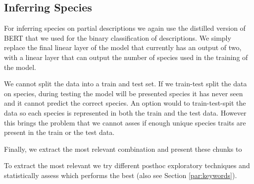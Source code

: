 \documentclass[a4paper, 12pt, oneside]{book} %
\begin{document}

\subsection{Inferring Species} \label{par:inferring}
For inferring species on partial descriptions we again use the distilled version of BERT \autocite{sanh_distilbert_2020, devlin_bert_2019} that we used for the binary classification of descriptions.
We simply replace the final linear layer of the model that currently has an output of two, with a linear layer that can output the number of species used in the training of the model.

We cannot split the data into a train and test set.
If we train-test split the data on species, during testing the model will be presented species it has never seen and it cannot predict the correct species.
An option would to train-test-spit the data so each species is represented in both the train and the test data.
However this brings the problem that we cannot asses if enough unique species traits are present in the train or the test data.


Finally, we extract the most relevant combination and present these chunks to 

To extract the most relevant we try different posthoc exploratory techniques and statistically assess which performs the best (also see Section \ref{par:keywords}).
\end{document}

